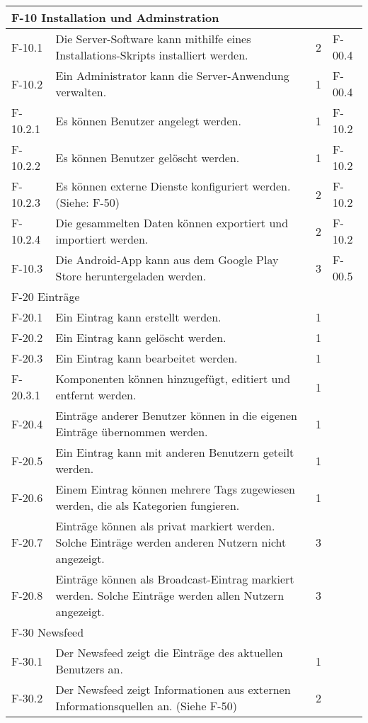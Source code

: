 \begin{tabularx}{\textwidth}{|l|X|l|l|}
    \multicolumn{4}{|l|}{F-10 Installation und Adminstration}\\
    \hline
    F-10.1 & Die Server-Software kann mithilfe eines Installations-Skripts installiert werden. & 2 & F-00.4 \\
    F-10.2   & Ein Administrator kann die Server-Anwendung verwalten. & 1 & F-00.4\\
    F-10.2.1 & Es können Benutzer angelegt werden. & 1 & F-10.2 \\
    F-10.2.2 & Es können Benutzer gelöscht werden. & 1 & F-10.2 \\
    F-10.2.3 & Es können externe Dienste konfiguriert werden. (Siehe: F-50)& 2 & F-10.2 \\
    F-10.2.4 & Die gesammelten Daten können exportiert und importiert werden. & 2 & F-10.2 \\
    F-10.3 & Die Android-App kann aus dem Google Play Store heruntergeladen werden. & 3 & F-00.5\\
    \hline
    \multicolumn{4}{|l|}{F-20 Einträge}\\
    \hline
    F-20.1 & Ein Eintrag kann erstellt werden. & 1 & \\
    F-20.2 & Ein Eintrag kann gelöscht werden. & 1 & \\
    F-20.3   & Ein Eintrag kann bearbeitet werden. & 1 & \\
    F-20.3.1 & Komponenten können hinzugefügt, editiert und entfernt werden. & 1 & \\
    F-20.4 & Einträge anderer Benutzer können in die eigenen Einträge übernommen werden. & 1 & \\
    F-20.5 & Ein Eintrag kann mit anderen Benutzern geteilt werden. & 1 & \\
    F-20.6 & Einem Eintrag können mehrere Tags zugewiesen werden, die als Kategorien fungieren. & 1 & \\
    F-20.7 & Einträge können als privat markiert werden.            Solche Einträge werden anderen Nutzern nicht angezeigt. & 3 & \\
    F-20.8 & Einträge können als Broadcast-Eintrag markiert werden. Solche Einträge werden allen Nutzern angezeigt. & 3 & \\
    \hline
    \multicolumn{4}{|l|}{F-30 Newsfeed}\\
    \hline
    F-30.1 & Der Newsfeed zeigt die Einträge des aktuellen Benutzers an. & 1 & \\
    F-30.2 & Der Newsfeed zeigt Informationen aus externen Informationsquellen an. (Siehe F-50) & 2 & \\

\end{tabularx}
